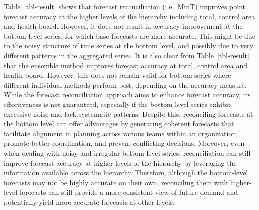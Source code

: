 \documentclass[
  authoryear,
  preprint,
  3p]{elsarticle}
\begin{document}
Table~\ref{tbl-result} shows that forecast reconciliation (i.e.~MinT)
improves point forecast accuracy at the higher levels of the hierarchy
including total, control area and health board. However, it does not
result in accuracy improvement at the bottom-level series, for which
base forecasts are more accurate. This might be due to the noisy
structure of time series at the bottom level, and possibly due to very
different patterns in the aggregated series. It is also clear from
Table~\ref{tbl-result} that the ensemble method improves forecast
accuracy at total, control area and health board. However, this does not
remain valid for bottom series where different individual methods
perform best, depending on the accuracy measure. While the forecast
reconciliation approach aims to enhance forecast accuracy, its
effectiveness is not guaranteed, especially if the bottom-level series
exhibit excessive noise and lack systematic patterns. Despite this,
reconciling forecasts at the bottom level can offer advantages by
generating coherent forecasts that facilitate alignment in planning
across various teams within an organization, promote better
coordination, and prevent conflicting decisions. Moreover, even when
dealing with noisy and irregular bottom-level series, reconciliation can
still improve forecast accuracy at higher levels of the hierarchy by
leveraging the information available across the hierarchy. Therefore,
although the bottom-level forecasts may not be highly accurate on their
own, reconciling them with higher-level forecasts can still provide a
more consistent view of future demand and potentially yield more
accurate forecasts at other levels.
\end{document}

